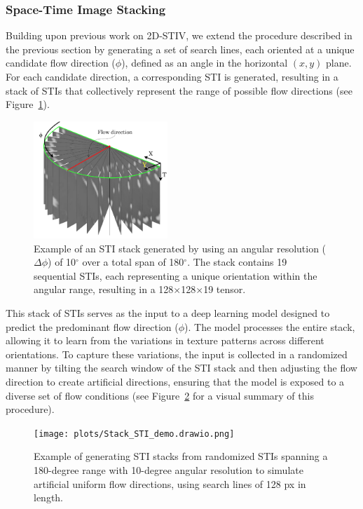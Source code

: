 \documentclass[12pt]{elsarticle}
\begin{document}
\newpage
\subsubsection{Space-Time Image Stacking}

Building upon previous work \cite{han_two-dimensional_2021, legleiter2024two} on 2D-STIV, we extend the procedure described in the previous section by generating a set of search lines, each oriented at a unique candidate flow direction ($\phi$), defined as an angle in the horizontal $(x, y)$ plane. For each candidate direction, a corresponding STI is generated, resulting in a stack of STIs that collectively represent the range of possible flow directions (see Figure~\ref{fig:sti_stack}).

\begin{figure}[!htbp]
    \centering
    \includegraphics[width=0.45\textwidth]{plots/STI_stack.drawio.png}
    \caption{Example of an STI stack generated by using an angular resolution ($\Delta\phi$) of 10$^\circ$ over a total span of 180$^\circ$. The stack contains 19 sequential STIs, each representing a unique orientation within the angular range, resulting in a 128$\times$128$\times$19 tensor.}
    \label{fig:sti_stack}
\end{figure}

This stack of STIs serves as the input to a deep learning model designed to predict the predominant flow direction ($\phi$). The model processes the entire stack, allowing it to learn from the variations in texture patterns across different orientations. To capture these variations, the input is collected in a randomized manner by tilting the search window of the STI stack and then adjusting the flow direction to create artificial directions, ensuring that the model is exposed to a diverse set of flow conditions (see Figure~\ref{fig:stack_sti_demo} for a visual summary of this procedure).

\begin{figure}[!htbp]
    \centering
    \texttt{[image: plots/Stack\_STI\_demo.drawio.png]}
    \caption{Example of generating STI stacks from randomized STIs spanning a 180-degree range with 10-degree angular resolution to simulate artificial uniform flow directions, using search lines of 128 px in length.}
    \label{fig:stack_sti_demo}
\end{figure}
\end{document}

